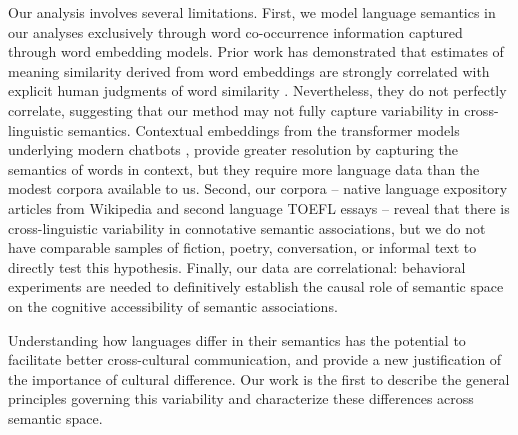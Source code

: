 \documentclass[9pt,twocolumn,twoside,lineno]{pnas-new}
\begin{document}
Our analysis involves several limitations. First, we model language semantics in our analyses exclusively through word co-occurrence information captured through word embedding models. Prior work has demonstrated that estimates of meaning similarity derived from word embeddings are strongly correlated with explicit human judgments of word similarity \cite{hill2015simlex,pereira2016comparative}. Nevertheless, they do not perfectly correlate, suggesting that our method may not fully capture variability in cross-linguistic semantics. Contextual embeddings from the transformer models underlying modern chatbots \cite{vaswani2017attention, devlin2018bert, radford2018improving}, provide greater resolution by capturing the semantics of words in context, but they require more language data than the modest corpora available to us. Second, our corpora -- native language expository articles from Wikipedia and second language TOEFL essays -- reveal that there is cross-linguistic variability in connotative semantic associations, but we do not have comparable samples of fiction, poetry, conversation, or informal text to directly test this hypothesis. Finally, our data are correlational: behavioral experiments are needed to definitively establish the causal role of semantic space on the cognitive accessibility of semantic associations. %

Understanding how languages differ in their semantics has the potential to facilitate better cross-cultural communication, and provide a new justification of the importance of cultural difference.  Our work is the first to describe the general principles governing this variability and characterize these differences across semantic space.

 
\end{document}
